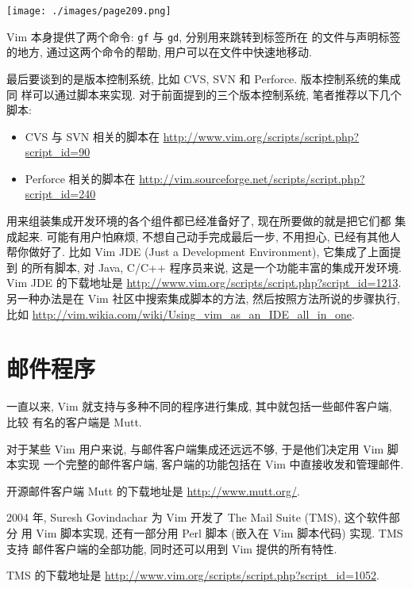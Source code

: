 \begin{center}
    \texttt{[image: ./images/page209.png]}
\end{center}
Vim 本身提供了两个命令: \texttt{gf} 与 \texttt{gd}, 分别用来跳转到标签所在
的文件与声明标签的地方, 通过这两个命令的帮助, 用户可以在文件中快速地移动.

最后要谈到的是版本控制系统, 比如 CVS, SVN 和 Perforce. 版本控制系统的集成同
样可以通过脚本来实现. 对于前面提到的三个版本控制系统, 笔者推荐以下几个脚本:
\begin{itemize}
    \item CVS 与 SVN 相关的脚本在
        \url{http://www.vim.org/scripts/script.php?script_id=90}
    \item Perforce 相关的脚本在
        \url{http://vim.sourceforge.net/scripts/script.php?script_id=240}
\end{itemize}

用来组装集成开发环境的各个组件都已经准备好了, 现在所要做的就是把它们都
集成起来. 可能有用户怕麻烦, 不想自己动手完成最后一步, 不用担心, 已经有其他人
帮你做好了. 比如 Vim JDE (Just a Development Environment), 它集成了上面提到
的所有脚本, 对 Java, C/C++ 程序员来说, 这是一个功能丰富的集成开发环境. Vim JDE
的下载地址是 \url{http://www.vim.org/scripts/script.php?script_id=1213}.
另一种办法是在 Vim 社区中搜索集成脚本的方法, 然后按照方法所说的步骤执行,
比如 \url{http://vim.wikia.com/wiki/Using_vim_as_an_IDE_all_in_one}.

\section{邮件程序}
\label{sec:mail_program}

一直以来, Vim 就支持与多种不同的程序进行集成, 其中就包括一些邮件客户端, 比较
有名的客户端是 Mutt.

对于某些 Vim 用户来说, 与邮件客户端集成还远远不够, 于是他们决定用 Vim 脚本实现
一个完整的邮件客户端, 客户端的功能包括在 Vim 中直接收发和管理邮件.

\begin{warning}
    开源邮件客户端 Mutt 的下载地址是 \url{http://www.mutt.org/}.
\end{warning}

2004 年, Suresh Govindachar 为 Vim 开发了 The Mail Suite (TMS), 这个软件部分
用 Vim 脚本实现, 还有一部分用 Perl 脚本 (嵌入在 Vim 脚本代码) 实现. TMS 支持
邮件客户端的全部功能, 同时还可以用到 Vim 提供的所有特性.

TMS 的下载地址是 \url{http://www.vim.org/scripts/script.php?script_id=1052}.

